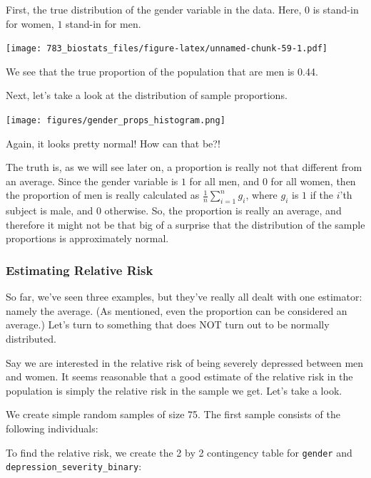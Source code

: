 \documentclass[]{book}
\theoremstyle{definition}
\theoremstyle{definition}
\theoremstyle{definition}
\theoremstyle{remark}
\begin{document}
First, the true distribution of the gender variable in the data. Here, \(0\) is stand-in for women, \(1\) stand-in for men.

\texttt{[image: 783\_biostats\_files/figure-latex/unnamed-chunk-59-1.pdf]}

We see that the true proportion of the population that are men is 0.44.

Next, let's take a look at the distribution of sample proportions.

\texttt{[image: figures/gender\_props\_histogram.png]}

Again, it looks pretty normal! How can that be?!

The truth is, as we will see later on, a proportion is really not that different from an average. Since the gender variable is \(1\) for all men, and \(0\) for all women, then the proportion of men is really calculated as \(\frac{1}{n}\sum_{i=1}^n g_i\), where \(g_i\) is \(1\) if the \(i\)'th subject is male, and \(0\) otherwise. So, the proportion is really an average, and therefore it might not be that big of a surprise that the distribution of the sample proportions is approximately normal.

\hypertarget{estimating-relative-risk}{%
\subsubsection*{Estimating Relative Risk}\label{estimating-relative-risk}}

So far, we've seen three examples, but they've really all dealt with one estimator: namely the average. (As mentioned, even the proportion can be considered an average.) Let's turn to something that does NOT turn out to be normally distributed.

Say we are interested in the relative risk of being severely depressed between men and women. It seems reasonable that a good estimate of the relative risk in the population is simply the relative risk in the sample we get. Let's take a look.

We create simple random samples of size 75. The first sample consists of the following individuals:

\hypertarget{htmlwidget-b9150501cb8ba77e69a3}{}

To find the relative risk, we create the 2 by 2 contingency table for \texttt{gender} and \texttt{depression\_severity\_binary}:
\end{document}
